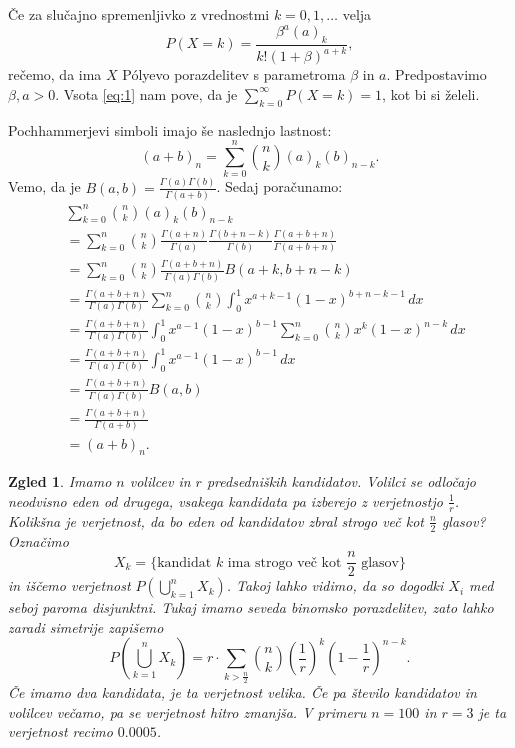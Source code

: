 \documentclass[10pt, a4paper]{article}
\newtheorem{zgled}[izr]{Zgled}
\begin{document}
Če za slučajno spremenljivko z vrednostmi $k = 0, 1, \dots$ 
velja 
$$P(X = k) = \frac{\beta^a (a)_k}{k! (1 + \beta)^{a + k}},$$
rečemo, da ima $X$ Pólyevo porazdelitev s parametroma $\beta$ in $a$. 
Predpostavimo $\beta, a > 0$. Vsota \eqref{eq:1} nam pove, da je $\sum_{k = 0}^\infty P(X = k) = 1$,
kot bi si želeli.

Pochhammerjevi simboli imajo še naslednjo lastnost:
$$(a + b)_n = \sum_{k = 0} ^n \binom{n}{k} (a)_k (b)_{n - k}.$$
Vemo, da je $B(a, b) = \frac{\Gamma(a) \Gamma(b)}{\Gamma(a + b)}$.
Sedaj poračunamo:
\begin{align*}
  &\sum_{k = 0} ^n \binom{n}{k} (a)_k (b)_{n - k}\\
  &= \sum_{k = 0} ^n \binom{n}{k} \frac{\Gamma(a + n)}{\Gamma(a)} \frac{\Gamma(b + n - k)}{\Gamma(b)} \frac{\Gamma(a + b+ n)}{\Gamma(a + b + n)}\\
  &= \sum_{k = 0} ^n \binom{n}{k} \frac{\Gamma(a + b + n)}{\Gamma(a) \Gamma(b)} B(a + k, b + n - k)\\
  &= \frac{\Gamma(a + b + n)}{\Gamma(a) \Gamma(b)} \sum_{k = 0} ^n \binom{n}{k} \int_0 ^1 x^{a + k - 1} (1 - x)^{b + n - k - 1}\, dx\\
  &= \frac{\Gamma(a + b + n)}{\Gamma(a) \Gamma(b)} \int_0 ^1 x^{a - 1} (1 - x)^{b - 1} \sum_{k = 0} ^n \binom{n}{k} x^k (1 - x)^{n - k}\, dx\\
  &= \frac{\Gamma(a + b + n)}{\Gamma(a) \Gamma(b)} \int_0 ^1 x^{a - 1} (1 - x)^{b - 1}\, dx\\
  &= \frac{\Gamma(a + b + n)}{\Gamma(a) \Gamma(b)} B(a, b)\\
  &= \frac{\Gamma(a + b + n)}{\Gamma (a + b)}\\
  &= (a + b)_n.
\end{align*}

\begin{zgled}
  Imamo $n$ volilcev in $r$ predsedniških kandidatov.
  Volilci se odločajo neodvisno eden od drugega, vsakega kandidata 
  pa izberejo z verjetnostjo $\frac{1}{r}$.
  Kolikšna je verjetnost, da bo eden od kandidatov zbral strogo več kot $\frac{n}{2}$ glasov?
  Označimo $$ X_k =\{\text{kandidat $k$ ima strogo več kot $\frac{n}{2}$ glasov}\}$$
  in iščemo verjetnost $P \left(\bigcup_{k = 1} ^n X_k\right)$.
  Takoj lahko vidimo, da so dogodki $X_i$ med seboj paroma disjunktni.
  Tukaj imamo seveda binomsko porazdelitev, zato lahko zaradi simetrije zapišemo 
  $$P \left(\bigcup_{k = 1} ^n X_k\right) = r \cdot \sum_{k > \frac{n}{2}} \binom{n}{k} \left(\frac{1}{r}\right)^k \left(1 - \frac{1}{r}\right)^{n - k}.$$
  Če imamo dva kandidata, je ta verjetnost velika. Če pa število kandidatov in volilcev
  večamo, pa se verjetnost hitro zmanjša. V primeru $n = 100$ in $r = 3$
  je ta verjetnost recimo $0.0005$.
\end{zgled}
\end{document}
